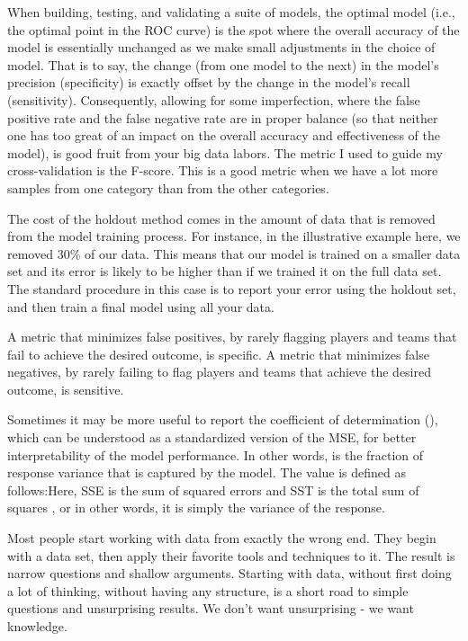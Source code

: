 \documentclass[]{book}
\begin{document}
When building, testing, and validating a suite of models, the optimal model (i.e., the optimal point in the ROC curve) is the spot where the overall accuracy of the model is essentially unchanged as we make small adjustments in the choice of model. That is to say, the change (from one model to the next) in the model's precision (specificity) is exactly offset by the change in the model's recall (sensitivity). Consequently, allowing for some imperfection, where the false positive rate and the false negative rate are in proper balance (so that neither one has too great of an impact on the overall accuracy and effectiveness of the model), is good fruit from your big data labors. The metric I used to guide my cross-validation is the F-score. This is a good metric when we have a lot more samples from one category than from the other categories.

The cost of the holdout method comes in the amount of data that is removed from the model training process. For instance, in the illustrative example here, we removed 30\% of our data. This means that our model is trained on a smaller data set and its error is likely to be higher than if we trained it on the full data set. The standard procedure in this case is to report your error using the holdout set, and then train a final model using all your data.

A metric that minimizes false positives, by rarely flagging players and teams that fail to achieve the desired outcome, is specific. A metric that minimizes false negatives, by rarely failing to flag players and teams that achieve the desired outcome, is sensitive.

Sometimes it may be more useful to report the coefficient of determination (), which can be understood as a standardized version of the MSE, for better interpretability of the model performance. In other words, is the fraction of response variance that is captured by the model. The value is defined as follows:Here, SSE is the sum of squared errors and SST is the total sum of squares , or in other words, it is simply the variance of the response.

Most people start working with data from exactly the wrong end. They begin with a data set, then apply their favorite tools and techniques to it. The result is narrow questions and shallow arguments. Starting with data, without first doing a lot of thinking, without having any structure, is a short road to simple questions and unsurprising results. We don't want unsurprising - we want knowledge.
\end{document}
